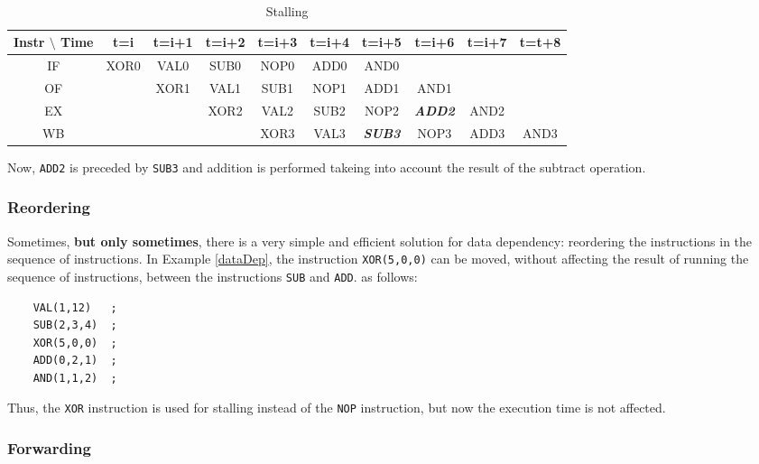 \begin{table}[H]
  \begin{center}
    \caption{Stalling}
    \label{stall}
    {\small
    {\tt
    \begin{tabular}{|c||c|c|c|c|c|c|c|c|c|}
      \hline
     Instr $\setminus$ Time & t=i & t=i+1 & t=i+2 & t=i+3 & t=i+4 & t=i+5 & t=i+6 & t=i+7 & t=t+8   \\ \hline \hline
        IF      & XOR0 & VAL0   & SUB0   & NOP0   & ADD0   & AND0   &     &       &         \\ \hline
        OF      &     & XOR1   & VAL1   & SUB1   & NOP1   & ADD1   & AND1   &         &         \\ \hline
        EX      &     &       & XOR2   & VAL2   & SUB2   & NOP2   & {\footnotesize {\bf {\em ADD2}}}   & AND2   &       \\ \hline
        WB      &     &       &       & XOR3   & VAL3   & {\footnotesize {\bf {\em SUB3}}}   & NOP3   & ADD3   & AND3       \\ \hline
    \end{tabular}
    }
    }
  \end{center}
\end{table}
Now, {\tt ADD2} is preceded by {\tt SUB3} and addition is performed takeing into account the result of the subtract operation.

\subsubsection{Reordering}

Sometimes, {\bf but only sometimes}, there is a very simple and efficient solution for data dependency: reordering the instructions in the sequence of instructions. In Example \ref{dataDep}, the instruction {\tt XOR(5,0,0)} can be moved, without affecting the result of running the sequence of instructions, between the instructions {\tt SUB} and {\tt ADD}. as follows:
\begin{verbatim}
    VAL(1,12)   ;
    SUB(2,3,4)  ;
    XOR(5,0,0)  ;
    ADD(0,2,1)  ;
    AND(1,1,2)  ;
\end{verbatim}
Thus, the {\tt XOR} instruction is used for stalling instead of the {\tt NOP} instruction, but now the execution time is not affected.

\subsubsection{Forwarding}

